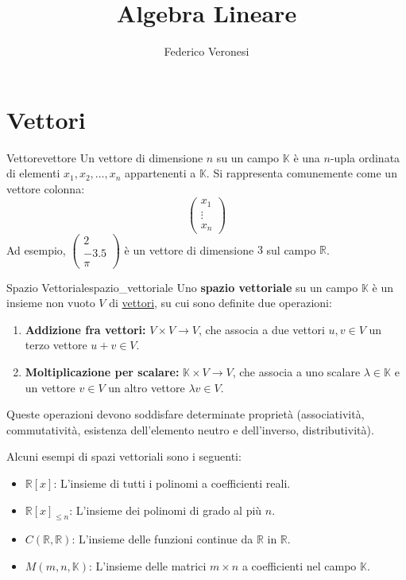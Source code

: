 \documentclass{article}
\title{Algebra Lineare}
\author{Federico Veronesi}
\begin{document}
\maketitle

{
    \hypersetup{linkcolor=black}
    \tableofcontents
}

\section{Vettori}

\begin{definition}{Vettore}{vettore}
    Un vettore di dimensione $n$ su un campo $\mathbb{K}$ è una $n$-upla ordinata di elementi $x_1, x_2, \dots, x_n$ appartenenti a $\mathbb{K}$. Si rappresenta comunemente come un vettore colonna:
    \[ \begin{pmatrix} x_1 \\ \vdots \\ x_n \end{pmatrix} \]
    Ad esempio, $\begin{pmatrix} 2 \\ -3.5 \\ \pi \end{pmatrix}$ è un vettore di dimensione $3$ sul campo $\mathbb{R}$.
\end{definition}

\begin{definition}{Spazio Vettoriale}{spazio_vettoriale}
    Uno \textbf{spazio vettoriale} su un campo $\mathbb{K}$ è un insieme non vuoto $V$ di \hyperref[def:vettore]{vettori}, su cui sono definite due operazioni:
    \begin{enumerate}
        \item \textbf{Addizione fra vettori:} $V \times V \to V$, che associa a due vettori $u, v \in V$ un terzo vettore $u+v \in V$.
        \item \textbf{Moltiplicazione per scalare:} $\mathbb{K} \times V \to V$, che associa a uno scalare $\lambda \in \mathbb{K}$ e un vettore $v \in V$ un altro vettore $\lambda v \in V$.
    \end{enumerate}
    Queste operazioni devono soddisfare determinate proprietà (associatività, commutatività, esistenza dell'elemento neutro e dell'inverso, distributività).
\end{definition}

Alcuni esempi di spazi vettoriali sono i seguenti:
\begin{itemize}
    \item $\mathbb{R}[x]$: L'insieme di tutti i polinomi a coefficienti reali.
    \item $\mathbb{R}[x]_{\le n}$: L'insieme dei polinomi di grado al più $n$.
    \item $C(\mathbb{R}, \mathbb{R})$: L'insieme delle funzioni continue da $\mathbb{R}$ in $\mathbb{R}$.
    \item $M(m, n, \mathbb{K})$: L'insieme delle matrici $m \times n$ a coefficienti nel campo $\mathbb{K}$.
\end{itemize}
\end{document}
